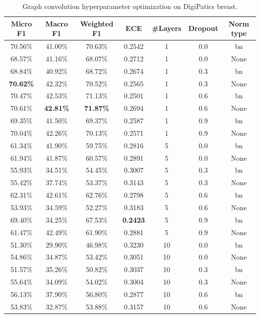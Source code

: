 \begin{table}[ht]
    \centering
    \caption{Graph convolution hyperparameter optimization on DigiPatics breast.}
\begin{tabular}{|c|c|c|c|c|c|c|}
\hline
Micro F1 & Macro F1 & Weighted F1 & ECE & \#Layers & Dropout & Norm type\\ \hline
70.56\% & 41.00\% & 70.63\% & 0.2542 & 1 & 0.0 & bn\\ \hline
68.57\% & 41.16\% & 68.07\% & 0.2712 & 1 & 0.0 & None\\ \hline
68.84\% & 40.92\% & 68.72\% & 0.2674 & 1 & 0.3 & bn\\ \hline
\textbf{70.62\%} & 42.32\% & 70.52\% & 0.2565 & 1 & 0.3 & None\\ \hline
70.47\% & 42.53\% & 71.13\% & 0.2501 & 1 & 0.6 & bn\\ \hline
70.61\% & \textbf{42.81\%} & \textbf{71.87\%} & 0.2694 & 1 & 0.6 & None\\ \hline
69.35\% & 41.50\% & 69.37\% & 0.2587 & 1 & 0.9 & bn\\ \hline
70.04\% & 42.26\% & 70.13\% & 0.2571 & 1 & 0.9 & None\\ \hline
61.34\% & 41.90\% & 59.75\% & 0.2816 & 5 & 0.0 & bn\\ \hline
61.94\% & 41.87\% & 60.57\% & 0.2891 & 5 & 0.0 & None\\ \hline
55.93\% & 34.51\% & 54.45\% & 0.3007 & 5 & 0.3 & bn\\ \hline
55.42\% & 37.74\% & 53.37\% & 0.3143 & 5 & 0.3 & None\\ \hline
62.31\% & 42.61\% & 62.76\% & 0.2798 & 5 & 0.6 & bn\\ \hline
53.93\% & 34.59\% & 52.27\% & 0.3183 & 5 & 0.6 & None\\ \hline
69.40\% & 34.25\% & 67.53\% & \textbf{0.2423} & 5 & 0.9 & bn\\ \hline
61.47\% & 42.49\% & 61.90\% & 0.2881 & 5 & 0.9 & None\\ \hline
51.30\% & 29.90\% & 46.98\% & 0.3230 & 10 & 0.0 & bn\\ \hline
54.86\% & 34.87\% & 53.42\% & 0.3051 & 10 & 0.0 & None\\ \hline
51.57\% & 35.26\% & 50.82\% & 0.3037 & 10 & 0.3 & bn\\ \hline
55.64\% & 34.09\% & 54.02\% & 0.3004 & 10 & 0.3 & None\\ \hline
56.13\% & 37.90\% & 56.80\% & 0.2877 & 10 & 0.6 & bn\\ \hline
53.83\% & 32.87\% & 53.88\% & 0.3157 & 10 & 0.6 & None\\ \hline

\end{tabular}
\end{table}
